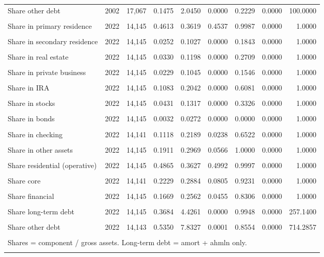 \begin{table}[htbp]
{\begin{tabular}{llrrrrrrr}
Share other debt & 2002 & 17,067 & 0.1475 & 2.0450 & 0.0000 & 0.2229 & 0.0000 & 100.0000 \\\\
Share in primary residence & 2022 & 14,145 & 0.4613 & 0.3619 & 0.4537 & 0.9987 & 0.0000 & 1.0000 \\\\
Share in secondary residence & 2022 & 14,145 & 0.0252 & 0.1027 & 0.0000 & 0.1843 & 0.0000 & 1.0000 \\\\
Share in real estate & 2022 & 14,145 & 0.0330 & 0.1198 & 0.0000 & 0.2709 & 0.0000 & 1.0000 \\\\
Share in private business & 2022 & 14,145 & 0.0229 & 0.1045 & 0.0000 & 0.1546 & 0.0000 & 1.0000 \\\\
Share in IRA & 2022 & 14,145 & 0.1083 & 0.2042 & 0.0000 & 0.6081 & 0.0000 & 1.0000 \\\\
Share in stocks & 2022 & 14,145 & 0.0431 & 0.1317 & 0.0000 & 0.3326 & 0.0000 & 1.0000 \\\\
Share in bonds & 2022 & 14,145 & 0.0032 & 0.0272 & 0.0000 & 0.0000 & 0.0000 & 1.0000 \\\\
Share in checking & 2022 & 14,141 & 0.1118 & 0.2189 & 0.0238 & 0.6522 & 0.0000 & 1.0000 \\\\
Share in other assets & 2022 & 14,145 & 0.1911 & 0.2969 & 0.0566 & 1.0000 & 0.0000 & 1.0000 \\\\
Share residential (operative) & 2022 & 14,145 & 0.4865 & 0.3627 & 0.4992 & 0.9997 & 0.0000 & 1.0000 \\\\
Share core & 2022 & 14,141 & 0.2229 & 0.2884 & 0.0805 & 0.9231 & 0.0000 & 1.0000 \\\\
Share financial & 2022 & 14,145 & 0.1669 & 0.2562 & 0.0455 & 0.8306 & 0.0000 & 1.0000 \\\\
Share long-term debt & 2022 & 14,145 & 0.3684 & 4.4261 & 0.0000 & 0.9948 & 0.0000 & 257.1400 \\\\
Share other debt & 2022 & 14,143 & 0.5350 & 7.8327 & 0.0001 & 0.8554 & 0.0000 & 714.2857 \\\\
\bottomrule
\multicolumn{9}{l}{\footnotesize Shares = component / gross assets. Long-term debt = amort + ahmln only.} \\\\
\end{tabular}}
\end{table}
